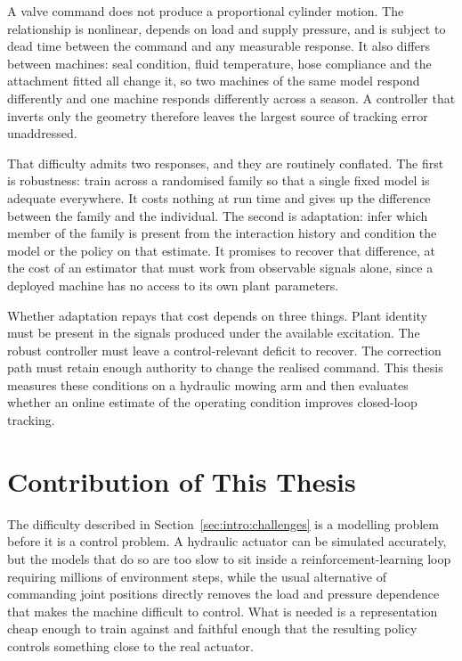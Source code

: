 A valve command does not produce a proportional cylinder motion. The
relationship is nonlinear, depends on load and supply pressure, and is subject
to dead time between the command and any measurable response. It also differs
between machines: seal condition, fluid temperature, hose compliance and the
attachment fitted all change it, so two machines of the same model respond
differently and one machine responds differently across a season. A controller
that inverts only the geometry therefore leaves the largest source of tracking
error unaddressed.

That difficulty admits two responses, and they are routinely conflated. The
first is robustness: train across a randomised family so that a single fixed
model is adequate everywhere. It costs nothing at run time and gives up the
difference between the family and the individual. The second is adaptation:
infer which member of the family is present from the interaction history and
condition the model or the policy on that estimate. It promises to recover
that
difference, at the cost of an estimator that must work from observable signals
alone, since a deployed machine has no access to its own plant parameters.

Whether adaptation repays that cost depends on three things. Plant identity must
be present in the signals produced under the available excitation. The robust
controller must leave a control-relevant deficit to recover. The correction
path must retain enough authority to change the realised command. This thesis
measures these conditions on a hydraulic mowing arm and then evaluates whether
an online estimate of the operating condition improves closed-loop tracking.

\section{Contribution of This Thesis}
\label{sec:intro:contributions}

The difficulty described in Section~\ref{sec:intro:challenges} is a modelling
problem before it is a control problem. A hydraulic actuator can be simulated
accurately, but the models that do so are too slow to sit inside a
reinforcement-learning loop requiring millions of environment steps, while the
usual alternative of commanding joint positions directly removes the load and
pressure dependence that makes the machine difficult to control. What is needed
is a representation cheap enough to train against and faithful enough that the
resulting policy controls something close to the real actuator.

